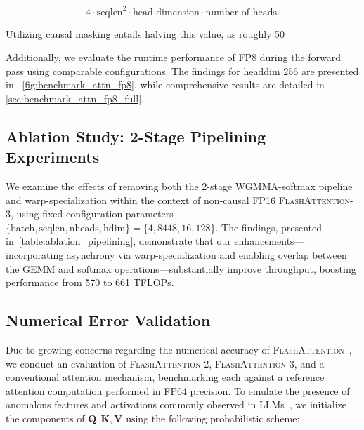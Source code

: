 \begin{algorithm}[H]
\begin{algorithmic}[1]
\begin{itemize}
\begin{equation*}
  4 \cdot \text{seqlen}^2 \cdot \text{head dimension} \cdot \text{number of heads}.
\end{equation*}

Utilizing causal masking entails halving this value, as roughly 50%

Additionally, we evaluate the runtime performance of FP8 during the forward pass using comparable configurations. The findings for headdim 256 are presented in ~\cref{fig:benchmark_attn_fp8}, while comprehensive results are detailed in \cref{sec:benchmark_attn_fp8_full}.

\subsection{Ablation Study: 2-Stage Pipelining Experiments}
\label{sec:2-stage-pipelining-experiments}

We examine the effects of removing both the 2-stage WGMMA-softmax pipeline and warp-specialization within the context of non-causal FP16 \textsc{FlashAttention-3}, using fixed configuration parameters $\{\text{batch}, \text{seqlen}, \text{nheads}, \text{hdim}\} = \{ 4, 8448, 16, 128\}$. The findings, presented in~\cref{table:ablation_pipelining}, demonstrate that our enhancements—incorporating asynchrony via warp-specialization and enabling overlap between the GEMM and softmax operations—substantially improve throughput, boosting performance from 570 to 661 TFLOPs.

\subsection{Numerical Error Validation}
\label{sec:numerical_error}

Due to growing concerns regarding the numerical accuracy of \textsc{FlashAttention}~\citep{golden2024flash}, we conduct an evaluation of \textsc{FlashAttention-2}, \textsc{FlashAttention-3}, and a conventional attention mechanism, benchmarking each against a reference attention computation performed in FP64 precision. To emulate the presence of anomalous features and activations commonly observed in LLMs~\citep{dettmers2208llm, sun2024massive}, we initialize the components of $\mathbf{Q}, \mathbf{K}, \mathbf{V}$ using the following probabilistic scheme:


\end{itemize}
\end{algorithmic}
\end{algorithm}

